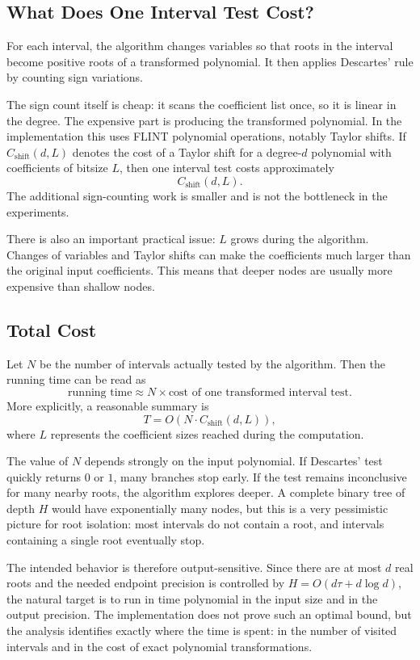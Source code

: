 \documentclass[letterpaper]{article}
\begin{document}
\subsection{What Does One Interval Test Cost?}

For each interval, the algorithm changes variables so that roots in the
interval become positive roots of a transformed polynomial. It then applies
Descartes' rule by counting sign variations.

The sign count itself is cheap: it scans the coefficient list once, so it is
linear in the degree. The expensive part is producing the transformed
polynomial. In the implementation this uses FLINT polynomial operations,
notably Taylor shifts. If $C_{\mathrm{shift}}(d,L)$ denotes the cost of a
Taylor shift for a degree-$d$ polynomial with coefficients of bitsize $L$,
then one interval test costs approximately
\[
  C_{\mathrm{shift}}(d,L).
\]
The additional sign-counting work is smaller and is not the bottleneck in the
experiments.

There is also an important practical issue: $L$ grows during the algorithm.
Changes of variables and Taylor shifts can make the coefficients much larger
than the original input coefficients. This means that deeper nodes are usually
more expensive than shallow nodes.

\subsection{Total Cost}

Let $N$ be the number of intervals actually tested by the algorithm. Then the
running time can be read as
\[
  \text{running time}
  \approx
  N \times \text{cost of one transformed interval test}.
\]
More explicitly, a reasonable summary is
\[
  T
  =
  O\!\left(N\cdot C_{\mathrm{shift}}(d,L)\right),
\]
where $L$ represents the coefficient sizes reached during the computation.

The value of $N$ depends strongly on the input polynomial. If Descartes' test
quickly returns $0$ or $1$, many branches stop early. If the test remains
inconclusive for many nearby roots, the algorithm explores deeper. A complete
binary tree of depth $H$ would have exponentially many nodes, but this is a
very pessimistic picture for root isolation: most intervals do not contain a
root, and intervals containing a single root eventually stop.

The intended behavior is therefore output-sensitive. Since there are at most
$d$ real roots and the needed endpoint precision is controlled by
$H=O(d\tau+d\log d)$, the natural target is to run in time polynomial in
the input size and in the output precision. The implementation does not prove
such an optimal bound, but the analysis identifies exactly where the time is
spent: in the number of visited intervals and in the cost of exact polynomial
transformations.
\end{document}
